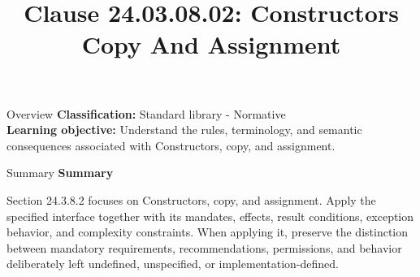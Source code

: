 \documentclass[10pt,letterpaper]{article}
\title{Clause 24.03.08.02: Constructors Copy And Assignment}
\author{}
\date{}
\begin{document}
\maketitle
\begin{CornellOverviewBox}{Overview}
\textbf{Classification:} Standard library - Normative\\[2pt]
\textbf{Learning objective:} Understand the rules, terminology, and semantic consequences associated with Constructors, copy, and assignment.
\end{CornellOverviewBox}\begin{CornellSummaryBox}{Summary}
{\sffamily\bfseries\color{Accent} Summary}\par\vspace{3pt}Section 24.3.8.2 focuses on Constructors, copy, and assignment. Apply the specified interface together with its mandates, effects, result conditions, exception behavior, and complexity constraints. When applying it, preserve the distinction between mandatory requirements, recommendations, permissions, and behavior deliberately left undefined, unspecified, or implementation-defined.
\end{CornellSummaryBox}
\end{document}
